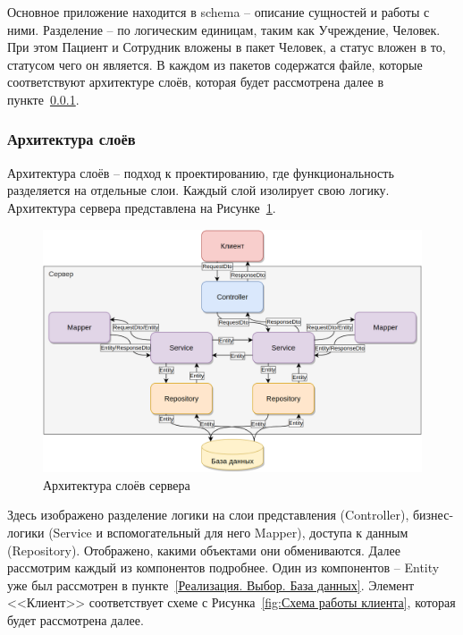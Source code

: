 \documentclass[a4paper,article]{article}
\begin{document}
\begin{sloppypar}
    Основное приложение находится в schema -- описание сущностей и работы с ними. Разделение -- по логическим единицам, таким как Учреждение, Человек. При этом Пациент и Сотрудник вложены в пакет Человек, а статус вложен в то, статусом чего он является. В каждом из пакетов содержатся файле, которые соответствуют архитектуре слоёв, которая будет рассмотрена далее в пункте~\ref{Реализация. Сервер. Архитектура слоёв}.

    \subsubsection{Архитектура слоёв}\label{Реализация. Сервер. Архитектура слоёв}

    Архитектура слоёв -- подход к проектированию, где функциональность разделяется на отдельные слои. Каждый слой изолирует свою логику. Архитектура сервера представлена на Рисунке~\ref{fig:Схема работы сервера}.

    \begin{figure}[h]

        \centering

        \includegraphics[width=0.9\linewidth]{Схема работы сервера.png}

        \caption{\centering Архитектура слоёв сервера}

        \label{fig:Схема работы сервера}

    \end{figure}

    Здесь изображено разделение логики на слои представления (Controller), бизнес-логики (Service и вспомогательный для него Mapper), доступа к данным (Repository). Отображено, какими объектами они обмениваются. Далее рассмотрим каждый из компонентов подробнее. Один из компонентов -- Entity уже был рассмотрен в пункте~\ref{Реализация. Выбор. База данных}. Элемент <<Клиент>> соответствует схеме с Рисунка~\ref{fig:Схема работы клиента}, которая будет рассмотрена далее.


\end{sloppypar}
\end{document}

